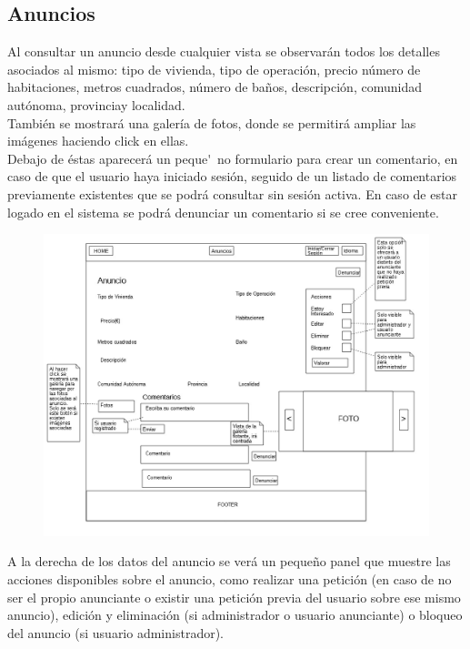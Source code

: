 \subsection{Anuncios}

Al consultar un anuncio desde cualquier vista se observar\'{a}n todos los detalles asociados al mismo: 
tipo de vivienda, tipo de operaci\'{o}n, precio n\'{u}mero de habitaciones, metros cuadrados, n\'{u}mero de ba\~{n}os, descripci\'{o}n, comunidad aut\'{o}noma, provinciay localidad.\\

Tambi\'{e}n se mostrar\'{a} una galer\'{i}a de fotos, donde se permitir\'{a} ampliar las im\'{a}genes haciendo click en ellas.\\

Debajo de \'{e}stas aparecer\'{a} un peque\'~{n}o formulario para crear un comentario, en caso de que el usuario haya iniciado sesi\'{o}n, seguido de un listado de comentarios previamente existentes que se podr\'{a} consultar sin sesi\'{o}n activa. En caso de estar logado en el sistema se podr\'{a} denunciar un comentario si se cree conveniente.\\

\begin{figure}[h!]
\centering
\includegraphics[width=1\textwidth]{Img/VisionAplicacion/vision_6.jpg}
\end{figure}

A la derecha de los datos del anuncio se ver\'{a} un peque\~{n}o panel que muestre las acciones disponibles sobre el anuncio, como realizar una petici\'{o}n (en caso de no ser el propio anunciante o existir una petici\'{o}n previa del usuario sobre ese mismo anuncio), edici\'{o}n y eliminaci\'{o}n (si administrador o usuario anunciante) o bloqueo del anuncio (si usuario administrador). \\

